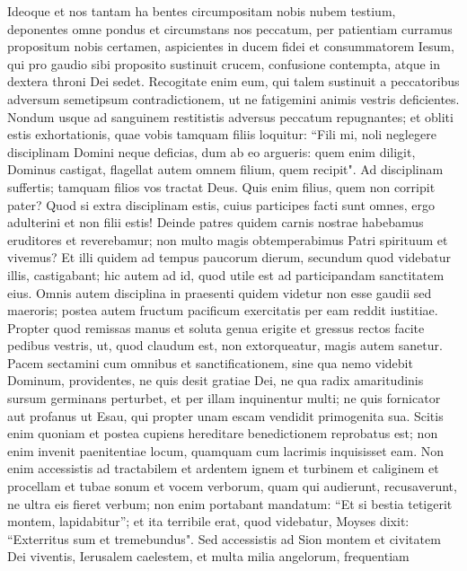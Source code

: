 \begin{biblechapter} 
\verse Ideoque et nos tantam ha bentes circumpositam nobis nubem testium, deponentes omne pondus et circumstans nos peccatum, per patientiam curramus propositum nobis certamen, 
\verse aspicientes in ducem fidei et consummatorem Iesum, qui pro gaudio sibi proposito sustinuit crucem, confusione contempta, atque in dextera throni Dei sedet. 
\verse Recogitate enim eum, qui talem sustinuit a peccatoribus adversum semetipsum contradictionem, ut ne fatigemini animis vestris deficientes. 
\verse Nondum usque ad sanguinem restitistis adversus peccatum repugnantes; 
\verse et obliti estis exhortationis, quae vobis tamquam filiis loquitur: “Fili mi, noli neglegere disciplinam Domini neque deficias, dum ab eo argueris: 
\verse quem enim diligit, Dominus castigat, flagellat autem omnem filium, quem recipit". 
\verse Ad disciplinam suffertis; tamquam filios vos tractat Deus. Quis enim filius, quem non corripit pater? 
\verse Quod si extra disciplinam estis, cuius participes facti sunt omnes, ergo adulterini et non filii estis! 
\verse Deinde patres quidem carnis nostrae habebamus eruditores et reverebamur; non multo magis obtemperabimus Patri spirituum et vivemus? 
\verse Et illi quidem ad tempus paucorum dierum, secundum quod videbatur illis, castigabant; hic autem ad id, quod utile est ad participandam sanctitatem eius. 
\verse Omnis autem disciplina in praesenti quidem videtur non esse gaudii sed maeroris; postea autem fructum pacificum exercitatis per eam reddit iustitiae. 
\verse Propter quod remissas manus et soluta genua erigite 
\verse et gressus rectos facite pedibus vestris, ut, quod claudum est, non extorqueatur, magis autem sanetur. 
\verse Pacem sectamini cum omnibus et sanctificationem, sine qua nemo videbit Dominum, 
\verse providentes, ne quis desit gratiae Dei, ne qua radix amaritudinis sursum germinans perturbet, et per illam inquinentur multi;  
\verse ne quis fornicator aut profanus ut Esau, qui propter unam escam vendidit primogenita sua. 
\verse Scitis enim quoniam et postea cupiens hereditare benedictionem reprobatus est; non enim invenit paenitentiae locum, quamquam cum lacrimis inquisisset eam. 
\verse Non enim accessistis ad tractabilem et ardentem ignem et turbinem et caliginem et procellam 
\verse et tubae sonum et vocem verborum, quam qui audierunt, recusaverunt, ne ultra eis fieret verbum; 
\verse non enim portabant mandatum: “Et si bestia tetigerit montem, lapidabitur”; 
\verse et ita terribile erat, quod videbatur, Moyses dixit: “Exterritus sum et tremebundus". 
\verse Sed accessistis ad Sion montem et civitatem Dei viventis, Ierusalem caelestem, et multa milia angelorum, frequentiam 

\end{biblechapter}

